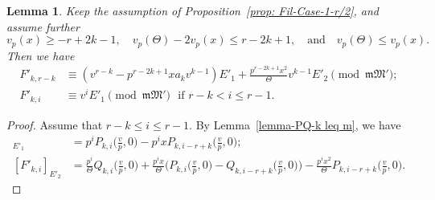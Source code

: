 \documentclass[11pt]{amsart}
\theoremstyle{definition}
\numberwithin{equation}{subsection}
\theoremstyle{plain}
\theoremstyle{plain}
\theoremstyle{plain}
\theoremstyle{plain}
\theoremstyle{plain}
\theoremstyle{plain}
\theoremstyle{plain}
\theoremstyle{plain}
\theoremstyle{plain}
\newtheorem{lemm}[equation]{Lemma}
\theoremstyle{plain}
\theoremstyle{plain}
\theoremstyle{plain}
\theoremstyle{definition}
\theoremstyle{definition}
\theoremstyle{definition}
\theoremstyle{remark}
\renewcommand{\(}{\textup{(}}
\renewcommand{\)}{\textup{)}}
\newcommand{\fM}{\mathfrak{M}}
\newcommand{\fm}{\mathfrak{m}}
\begin{document}
\begin{lemm}\label{lemma 0 < k <r/2. r-k leq i leq r-1}
Keep the assumption of Proposition~\ref{prop: Fil-Case-1-r/2}, and assume further
\begin{equation*}
v_p(x)\geq -r+2k-1,\quad v_p(\Theta)-2v_p(x)\leq r-2k+1,\quad\mbox{and}\quad v_p(\Theta)\leq v_p(x).
\end{equation*}
Then we have
\begin{align*}
F'_{k,r-k}
&\equiv
    (v^{r-k}-p^{r-2k+1}xa_kv^{k-1})E'_1
    +\frac{p^{r-2k+1}x^2}{\Theta}v^{k-1}E'_2\pmod{\fm\fM'}; \\
F'_{k,i}&\equiv v^iE'_1\pmod{\fm\fM'}\,\,\mbox{ if }r-k<i\leq r-1.
\end{align*}
\end{lemm}

\begin{proof}
Assume that $r-k\leq i\leq r-1$. By Lemma~\ref{lemma-PQ-k leq m}, we have
\begin{align*}
[F'_{k,i}]_{E'_1}
    &=p^i P_{k,i}\Big(\frac{v}{p},0\Big)
    -p^ix P_{k,i-r+k}\Big(\frac{v}{p},0\Big);
    \\
[F'_{k,i}]_{E'_2}
    &=\frac{p^i}{\Theta}Q_{k,i}\Big(\frac{v}{p},0\Big)
    +\frac{p^ix}{\Theta}
    \Big(P_{k,i}\Big(\frac{v}{p},0\Big)
    -Q_{k,i-r+k}\Big(\frac{v}{p},0\Big)\Big)
    -\frac{p^ix^2}{\Theta}P_{k,i-r+k}\Big(\frac{v}{p},0\Big).
\end{align*}



\end{proof}
\end{document}
